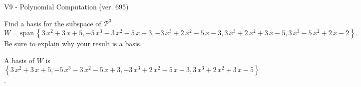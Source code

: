 \begin{exercise}
  \begin{exerciseTitle}V9 - Polynomial Computation (ver. 695)\end{exerciseTitle}
  \begin{exerciseStatement}
    Find a basis for the subspace of \(\mathcal{P}^3\) 
\[W=\mathrm{span}\ \left\{3 \, x^{2} + 3 \, x + 5 , -5 \, x^{3} - 3 \, x^{2} - 5 \, x + 3 , -3 \, x^{3} + 2 \, x^{2} - 5 \, x - 3 , 3 \, x^{3} + 2 \, x^{2} + 3 \, x - 5 , 3 \, x^{3} - 5 \, x^{2} + 2 \, x - 2\right\}.\]
 Be sure to explain why your result is a basis.


  \end{exerciseStatement}
  \begin{exerciseAnswer}
   A basis of \(W\) is  \(\left\{3 \, x^{2} + 3 \, x + 5 , -5 \, x^{3} - 3 \, x^{2} - 5 \, x + 3 , -3 \, x^{3} + 2 \, x^{2} - 5 \, x - 3 , 3 \, x^{3} + 2 \, x^{2} + 3 \, x - 5\right\}\).
  


  \end{exerciseAnswer}
\end{exercise}